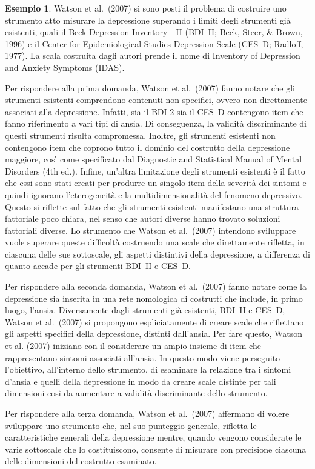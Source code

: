 \documentclass[
  11pt,
]{krantz}
\theoremstyle{definition}
\theoremstyle{definition}
\newtheorem{example}{Esempio}[chapter]
\theoremstyle{definition}
\theoremstyle{definition}
\theoremstyle{remark}
\begin{document}
\begin{example}
Watson et al.~(2007) si sono posti il problema di costruire uno strumento atto misurare la depressione superando i limiti degli strumenti già esistenti, quali il Beck Depression Inventory---II (BDI--II; Beck, Steer, \& Brown, 1996) e il Center for Epidemiological Studies Depression Scale (CES--D; Radloff, 1977). La scala costruita dagli autori prende il nome di Inventory of Depression and Anxiety Symptoms (IDAS).

Per rispondere alla prima domanda, Watson et al.~(2007) fanno notare che gli strumenti esistenti comprendono contenuti non specifici, ovvero non direttamente associati alla depressione. Infatti, sia il BDI-2 sia il CES--D contengono item che fanno riferimento a vari tipi di ansia. Di conseguenza, la validità discriminante di questi strumenti risulta compromessa. Inoltre, gli strumenti esistenti non contengono item che coprono tutto il dominio del costrutto della depressione maggiore, così come specificato dal Diagnostic and Statistical Manual of Mental Disorders (4th ed.). Infine, un'altra limitazione degli strumenti esistenti è il fatto che essi sono stati creati per produrre un singolo item della severità dei sintomi e quindi ignorano l'eterogeneità e la multidimensionalità del fenomeno depressivo. Questo si riflette sul fatto che gli strumenti esistenti manifestano una struttura fattoriale poco chiara, nel senso che autori diverse hanno trovato soluzioni fattoriali diverse. Lo strumento che Watson et al.~(2007) intendono sviluppare vuole superare queste difficoltà costruendo una scale che direttamente rifletta, in ciascuna delle sue sottoscale, gli aspetti distintivi della depressione, a differenza di quanto accade per gli strumenti BDI--II e CES--D.

Per rispondere alla seconda domanda, Watson et al.~(2007) fanno notare come la depressione sia inserita in una rete nomologica di costrutti che include, in primo luogo, l'ansia. Diversamente dagli strumenti già esistenti, BDI--II e CES--D, Watson et al.~(2007) si propongono espliciatamente di creare scale che riflettano gli aspetti specifici della depressione, distinti dall'ansia. Per fare questo, Watson et al. (2007) iniziano con il considerare un ampio insieme di item che rappresentano sintomi associati all'ansia. In questo modo viene perseguito l'obiettivo, all'interno dello strumento, di esaminare la relazione tra i sintomi d'ansia e quelli della depressione in modo da creare scale distinte per tali dimensioni così da aumentare a validità discriminante dello strumento.

Per rispondere alla terza domanda, Watson et al.~(2007) affermano di volere sviluppare uno strumento che, nel suo punteggio generale, rifletta le caratteristiche generali della depressione mentre, quando vengono considerate le varie sottoscale che lo costituiscono, consente di misurare con precisione ciascuna delle dimensioni del costrutto esaminato.
\end{example}
\end{document}
